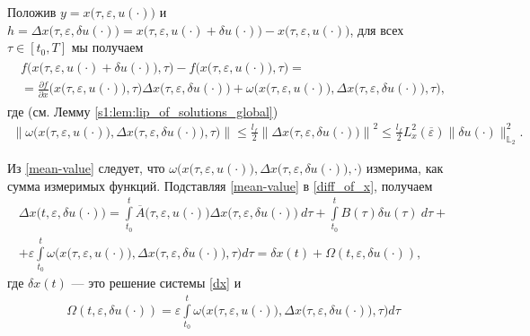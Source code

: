 \documentclass[../main.tex]{subfiles}
\begin{document}
Положив $y = x\big(\tau,\varepsilon, u(\cdot)\big)$  и $h = \Delta x\big(\tau, \varepsilon, \delta u(\cdot)\big) = x\big(\tau,\varepsilon, u(\cdot) + \delta u(\cdot)\big) - x\big(\tau,\varepsilon, u(\cdot)\big)$, для всех $\tau \in [t_0,T]$ мы получаем
\begin{gather}\label{mean-value}
    \begin{gathered}
        f\Big(x\big(\tau,\varepsilon, u(\cdot) + \delta u(\cdot)\big),\tau\Big) -
        f\Big(x\big(\tau,\varepsilon, u(\cdot)\big),\tau\Big) = \\ = 
        \frac{\partial f}{\partial x}  \Big(x\big(\tau,\varepsilon, u(\cdot)\big), \tau\Big) 
        \Delta x\big(\tau, \varepsilon, \delta u(\cdot)\big)  + 
        \omega\Big(x\big(\tau,\varepsilon, u(\cdot)\big),\Delta x\big(\tau, \varepsilon, \delta u(\cdot)\big),\tau\Big),
    \end{gathered}
\end{gather}
где (см. Лемму \ref{s1:lem:lip_of_solutions_global})
\begin{gather}\label{omega_est}
    \left\|\omega\Big(x\big(\tau,\varepsilon, u(\cdot)\big),\Delta x\big(\tau, \varepsilon, \delta u(\cdot)\big),\tau\Big)\right\| 
    \leqslant
    \frac{l_f}{2} \left\|\Delta x\big(\tau, \varepsilon, \delta u(\cdot)\big)\right\|^2 
    \leqslant
    \frac{l_f}{2} L_x^2(\overline{\varepsilon}) \|\delta u(\cdot)\|_{\mathbb{L}_2}^2.
\end{gather}

Из \eqref{mean-value} следует, что $\omega\Big(x\big(\tau,\varepsilon, u(\cdot)\big),\Delta x\big(\tau, \varepsilon, \delta u(\cdot)\big),\cdot\big)$ измерима, как сумма измеримых функций.
Подставляя \eqref{mean-value} в \eqref{diff_of_x}, получаем
\begin{gather*}
    \Delta x\big(t, \varepsilon, \delta u(\cdot)\big)
    = \int\limits_{t_0}^t 
    \overline{A}\big(\tau,\varepsilon,u(\cdot)\big) 
    \Delta x\big(\tau, \varepsilon, \delta u(\cdot)\big)\ d\tau + 
    \int\limits_{t_0}^t B(\tau) \delta u(\tau)\ d\tau + \\ +
    \varepsilon\int\limits_{t_0}^t \omega\Big(x\big(\tau,\varepsilon, u(\cdot)\big),\Delta x\big(\tau, \varepsilon, \delta u(\cdot)\big),\tau\Big) d\tau = 
    \delta x(t) + \Omega(t,\varepsilon, \delta u(\cdot)),
\end{gather*}
где $\delta x(t)$ --- это решение системы \eqref{dx} и
\begin{gather*}
    \Omega(t,\varepsilon, \delta u(\cdot)) = \varepsilon\int\limits_{t_0}^t 
    \omega\Big(x\big(\tau,\varepsilon, u(\cdot)\big),\Delta x\big(\tau, \varepsilon, \delta u(\cdot)\big),\tau\Big) d\tau
\end{gather*}
\end{document}

